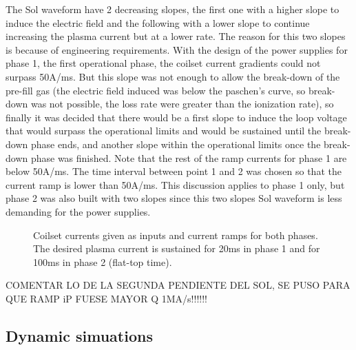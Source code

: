\documentclass[a4paper,12pt,oneside]{book}
\begin{document}
The Sol waveform have 2 decreasing slopes, the first one with a higher slope to induce the electric field and the following with a lower slope to continue increasing the plasma current but at a lower rate. The reason for this two slopes is because of engineering requirements. With the design of the power supplies for phase 1, the first operational phase, the coilset current gradients could not surpass 50A/ms. But this slope was not enough to allow the break-down of the pre-fill gas (the electric field induced was below the paschen's curve, so break-down was not possible, the loss rate were greater than the ionization rate), so finally it was decided that there would be a first slope to induce the loop voltage that would surpass the operational limits and would be sustained until the break-down phase ends, and another slope within the operational limits once the break-down phase was finished. Note that the rest of the ramp currents for phase 1 are below 50A/ms. The time interval between point 1 and 2 was chosen so that the current ramp is lower than 50A/ms. This discussion applies to phase 1 only, but phase 2 was also built with two slopes since this two slopes Sol waveform is less demanding for the power supplies.

\begin{figure}[h!]
\centering
{}
\hfill
{}

\hfill
{}

\caption{Coilset currents given as inputs and current ramps for both phases. The desired plasma current is sustained for 20ms in phase 1 and for 100ms in phase 2 (flat-top time).}
\label{fig_Input_currents}
\end{figure}


COMENTAR LO DE LA SEGUNDA PENDIENTE DEL SOL, SE PUSO PARA QUE RAMP iP FUESE MAYOR Q 1MA/s!!!!!!

\subsection{Dynamic simuations}
\end{document}
